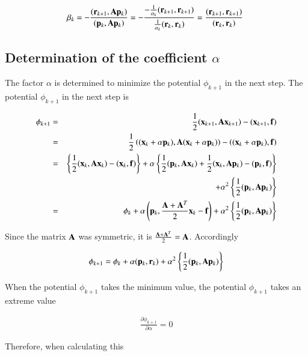 \begin{equation}
\beta_k=-\frac{(\mathbf{r}_{k+1},\mathbf{A}\mathbf{p}_k)}{(\mathbf{p}_k,\mathbf{A}\mathbf{p}_k)}=-\frac{-\frac{1}{\alpha_k}(\mathbf{r}_{k+1},\mathbf{r}_{k+1})}{\frac{1}{\alpha_k}(\mathbf{r}_k,\mathbf{r}_k)}=\frac{(\mathbf{r}_{k+1},\mathbf{r}_{k+1})}{(\mathbf{r}_k,\mathbf{r}_k)}~
\end{equation}





\subsection{Determination of the coefficient $\alpha$}


The factor $\alpha$ is determined to minimize the potential $\phi_{k+1}$ in the next step.
The potential $\phi_{k+1}$ in the next step is

\begin{eqnarray}
\phi_{k+1} &=& \frac{1}{2}(\mathbf{x}_{k+1},\mathbf{A}\mathbf{x}_{k+1})-(\mathbf{x}_{k+1},\mathbf{f})\\
&=& \frac{1}{2}\left((\mathbf{x}_k+\alpha\mathbf{p}_k),\mathbf{A}(\mathbf{x}_k+\alpha\mathbf{p}_k)\right)-\left((\mathbf{x}_k+\alpha\mathbf{p}_k),\mathbf{f}\right)\\
&=& \left\{\frac{1}{2}(\mathbf{x}_k,\mathbf{A}\mathbf{x}_k)-(\mathbf{x}_k,\mathbf{f})\right\} + \alpha\left\{\frac{1}{2}(\mathbf{p}_k,\mathbf{A}\mathbf{x}_k)+\frac{1}{2}(\mathbf{x}_k,\mathbf{A}\mathbf{p}_k)-(\mathbf{p}_k,\mathbf{f})\right\}\\
&& + \alpha^2\left\{\frac{1}{2}(\mathbf{p}_k,\mathbf{A}\mathbf{p}_k)\right\}\\
&=& \phi_k+\alpha\left(\mathbf{p}_k,\frac{\mathbf{A}+\mathbf{A}^T}{2}\mathbf{x}_k-\mathbf{f}\right)+\alpha^2\left\{\frac{1}{2}(\mathbf{p}_k,\mathbf{A}\mathbf{p}_k)\right\}
\end{eqnarray}


Since the matrix $\mathbf{A}$ was symmetric, it is $\frac{\mathbf{A}+\mathbf{A}^T}{2}=\mathbf{A}$. Accordingly

\begin{eqnarray}
\phi_{k+1} = \phi_k+\alpha(\mathbf{p}_k,\mathbf{r}_k)+\alpha^2\left\{\frac{1}{2}(\mathbf{p}_k,\mathbf{A}\mathbf{p}_k)\right\}
\end{eqnarray}


When the potential $\phi_{k+1}$ takes the minimum value, the potential $\phi_{k+1}$ takes an extreme value

\begin{eqnarray}
\frac{\partial\phi_{k+1}}{\partial\alpha}=0
\end{eqnarray}


Therefore, when calculating this

